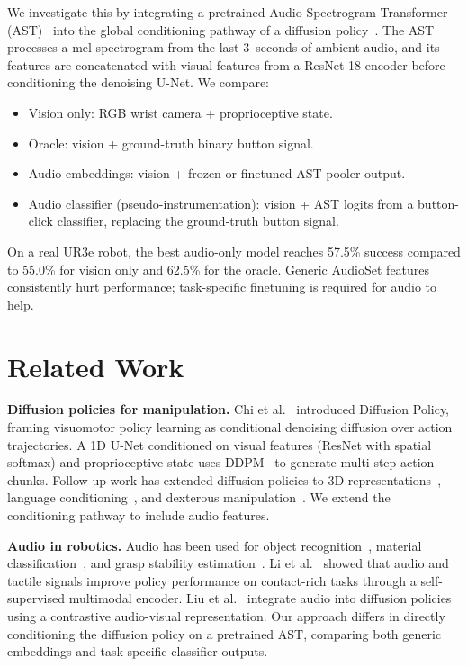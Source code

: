 \documentclass[conference]{IEEEtran}
\begin{document}
We investigate this by integrating a pretrained Audio Spectrogram Transformer (AST)~\cite{gong2021ast} into the global conditioning pathway of a diffusion policy~\cite{chi2023diffusion}.
The AST processes a mel-spectrogram from the last 3~seconds of ambient audio, and its features are concatenated with visual features from a ResNet-18 encoder before conditioning the denoising U-Net.
We compare:
\begin{itemize}
    \item Vision only: RGB wrist camera + proprioceptive state.
    \item Oracle: vision + ground-truth binary button signal.
    \item Audio embeddings: vision + frozen or finetuned AST pooler output.
    \item Audio classifier (pseudo-instrumentation): vision + AST logits from a button-click classifier, replacing the ground-truth button signal.
\end{itemize}

On a real UR3e robot, the best audio-only model reaches 57.5\% success compared to 55.0\% for vision only and 62.5\% for the oracle.
Generic AudioSet features consistently hurt performance; task-specific finetuning is required for audio to help.

\section{Related Work}

\textbf{Diffusion policies for manipulation.}
Chi et al.~\cite{chi2023diffusion} introduced Diffusion Policy, framing visuomotor policy learning as conditional denoising diffusion over action trajectories.
A 1D U-Net conditioned on visual features (ResNet with spatial softmax) and proprioceptive state uses DDPM~\cite{ho2020ddpm} to generate multi-step action chunks.
Follow-up work has extended diffusion policies to 3D representations~\cite{ze20243ddp}, language conditioning~\cite{ha2023scaling}, and dexterous manipulation~\cite{chi2024universal}.
We extend the conditioning pathway to include audio features.

\textbf{Audio in robotics.}
Audio has been used for object recognition~\cite{gandhi2020swoosh}, material classification~\cite{clarke2018learning}, and grasp stability estimation~\cite{huang2024audiograsp}.
Li et al.~\cite{li2022seehearfeel} showed that audio and tactile signals improve policy performance on contact-rich tasks through a self-supervised multimodal encoder.
Liu et al.~\cite{liu2024maniwav} integrate audio into diffusion policies using a contrastive audio-visual representation.
Our approach differs in directly conditioning the diffusion policy on a pretrained AST, comparing both generic embeddings and task-specific classifier outputs.
\end{document}
